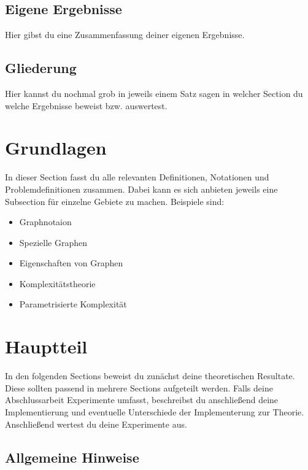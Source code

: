 \documentclass[12pt,a4paper]{article}
\begin{document}
\subsection{Eigene Ergebnisse}
Hier gibst du eine Zusammenfassung deiner eigenen Ergebnisse.

\subsection{Gliederung}
Hier kannst du nochmal grob in jeweils einem Satz sagen in welcher Section du welche Ergebnisse beweist bzw. auswertest.


\section{Grundlagen}
In dieser Section fasst du alle relevanten Definitionen, Notationen und Problemdefinitionen zusammen.
Dabei kann es sich anbieten jeweils eine Subsection für einzelne Gebiete zu machen. Beispiele sind:
\begin{itemize}
\item Graphnotaion
\item Spezielle Graphen
\item Eigenschaften von Graphen
\item Komplexitätstheorie
\item Parametrisierte Komplexität
\end{itemize}


\section{Hauptteil}
In den folgenden Sections beweist du zunächst deine theoretischen Resultate. 
Diese sollten passend in mehrere Sections aufgeteilt werden.
Falls deine Abschlussarbeit Experimente umfasst, beschreibst du anschließend deine Implementierung und eventuelle Unterschiede der Implementerung zur Theorie.
Anschließend wertest du deine Experimente aus.

\subsection{Allgemeine Hinweise}
  
\end{document}
